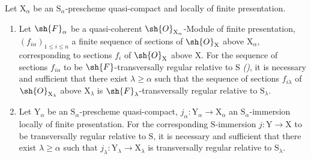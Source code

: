 \begin{proposition}[19.8.2]
\label{IV.19.8.2}
Let $\mathrm{X}_\alpha$ be an $\mathrm{S}_\alpha$-prescheme quasi-compact and locally of finite presentation.
\begin{enumerate}
\item[\rm(i)] Let $\sh{F}_\alpha$ be a quasi-coherent $\sh{O}_{\mathrm{X}_\alpha}$-Module of finite presentation, $(f_{i\alpha})_{1\leqslant i\leqslant n}$ a finite sequence of sections of $\sh{O}_\mathrm{X}$ above $\mathrm{X}_\alpha$, corresponding to sections $f_i$ of $\sh{O}_\mathrm{X}$ above $\mathrm{X}$. For the sequence of sections $f_{i\alpha}$ to be $\sh{F}$-transversally regular relative to $\mathrm{S}$ \emph{()}, it is necessary and sufficient that there exist $\lambda\geqslant\alpha$ such that the sequence of sections $f_{i\lambda}$ of $\sh{O}_{\mathrm{X}_\lambda}$ above $\mathrm{X}_\lambda$ is $\sh{F}_\lambda$-transversally regular relative to $\mathrm{S}_\lambda$.
\item[\rm(ii)] Let $\mathrm{Y}_\alpha$ be an $\mathrm{S}_\alpha$-prescheme quasi-compact, $j_\alpha:\mathrm{Y}_\alpha\to\mathrm{X}_\alpha$ an $\mathrm{S}_\alpha$-immersion locally of finite presentation. For the corresponding $\mathrm{S}$-immersion $j:\mathrm{Y}\to\mathrm{X}$ to be transversally regular relative to $\mathrm{S}$, it is necessary and sufficient that there exist $\lambda\geqslant\alpha$ such that $j_\lambda:\mathrm{Y}_\lambda\to\mathrm{X}_\lambda$ is transversally regular relative to $\mathrm{S}_\lambda$.
\end{enumerate}
\end{proposition}

